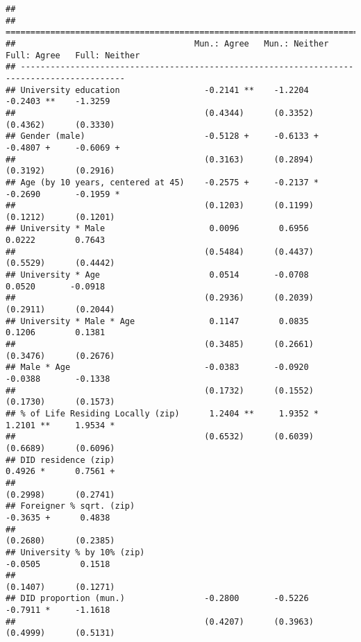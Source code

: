 \documentclass[
]{article}
\begin{document}
\begin{verbatim}
## 
## ===========================================================================================
##                                    Mun.: Agree   Mun.: Neither  Full: Agree   Full: Neither
## -------------------------------------------------------------------------------------------
## University education                 -0.2141 **    -1.2204        -0.2403 **    -1.3259    
##                                      (0.4344)      (0.3352)       (0.4362)      (0.3330)   
## Gender (male)                        -0.5128 +     -0.6133 +      -0.4807 +     -0.6069 +  
##                                      (0.3163)      (0.2894)       (0.3192)      (0.2916)   
## Age (by 10 years, centered at 45)    -0.2575 +     -0.2137 *      -0.2690       -0.1959 *  
##                                      (0.1203)      (0.1199)       (0.1212)      (0.1201)   
## University * Male                     0.0096        0.6956         0.0222        0.7643    
##                                      (0.5484)      (0.4437)       (0.5529)      (0.4442)   
## University * Age                      0.0514       -0.0708         0.0520       -0.0918    
##                                      (0.2936)      (0.2039)       (0.2911)      (0.2044)   
## University * Male * Age               0.1147        0.0835         0.1206        0.1381    
##                                      (0.3485)      (0.2661)       (0.3476)      (0.2676)   
## Male * Age                           -0.0383       -0.0920        -0.0388       -0.1338    
##                                      (0.1732)      (0.1552)       (0.1730)      (0.1573)   
## % of Life Residing Locally (zip)      1.2404 **     1.9352 *       1.2101 **     1.9534 *  
##                                      (0.6532)      (0.6039)       (0.6689)      (0.6096)   
## DID residence (zip)                                                0.4926 *      0.7561 +  
##                                                                   (0.2998)      (0.2741)   
## Foreigner % sqrt. (zip)                                           -0.3635 +      0.4838    
##                                                                   (0.2680)      (0.2385)   
## University % by 10% (zip)                                         -0.0505        0.1518    
##                                                                   (0.1407)      (0.1271)   
## DID proportion (mun.)                -0.2800       -0.5226        -0.7911 *     -1.1618    
##                                      (0.4207)      (0.3963)       (0.4999)      (0.5131)   

\end{verbatim}
\end{document}
